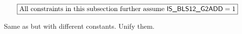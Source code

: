 \[
	\boxed{\text{All constraints in this subsection further assume } \textsf{IS\_BLS12\_G2ADD} = 1}
\]

Same as \oobInstBlsGOneAdd{} but with different constants. Unify them.